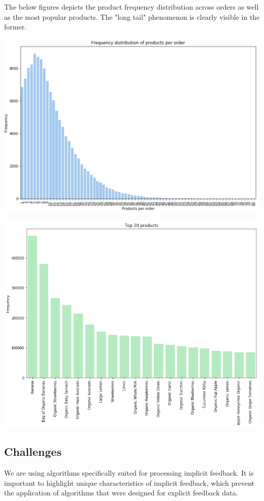 \documentclass[letterpaper,12pt]{article}
\begin{document}
The below figures depicts the product frequency distribution across orders as well as the most popular products. The "long tail" phenomenon is clearly visible in the former.
\begin{center}
	\includegraphics[scale=0.2]{train_products_order}
\end{center} 

\begin{center}
	\includegraphics[scale=0.4]{top_20_products.png}
\end{center}


\subsection{Challenges}
We are using algorithms specifically suited for processing implicit feedback. It is important to highlight unique characteristics of implicit feedback, which prevent the application of algorithms that were designed for explicit feedback data.
\end{document}
